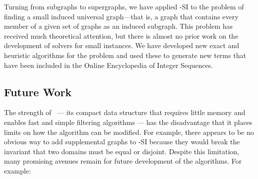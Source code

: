 Turning from subgraphs to supergraphs,
we have applied \McSplit-SI to the problem of finding a small induced universal
graph---that is, a graph that contains every member of a given set of graphs as
an induced subgraph. This problem has received much theoretical attention,
but there is almost no prior work on the development of solvers for
small instances.  We have developed new exact and heuristic algorithms for the
problem and used these to generate new terms that have been included in the
Online Encyclopedia of Integer Sequences.

\subsection{Future Work}

The strength of \McSplit\ --- its compact data structure that requires little
memory and enables fast and simple filtering algorithms --- has the
disadvantage that it places limits on how the algorithm can be modified.  For example, there
appears to be no obvious way to add supplemental graphs to \McSplit-SI because
they would break the invariant that two domains must be equal or disjoint.  Despite
this limitation,
many promising avenues remain for future development of the
algorithms. For example:

